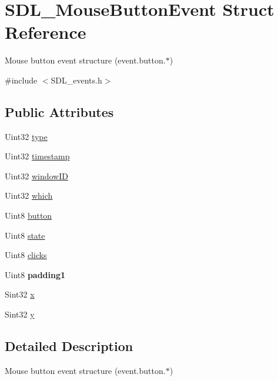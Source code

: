 \hypertarget{struct_s_d_l___mouse_button_event}{}\section{S\+D\+L\+\_\+\+Mouse\+Button\+Event Struct Reference}
\label{struct_s_d_l___mouse_button_event}


Mouse button event structure (event.\+button.$\ast$)  




{\ttfamily \#include $<$S\+D\+L\+\_\+events.\+h$>$}

\subsection*{Public Attributes}
\begin{DoxyCompactItemize}
\item 
Uint32 \mbox{\hyperlink{struct_s_d_l___mouse_button_event_af64cb09ea68b8081ecc8ee498552e3d7}{type}}
\item 
Uint32 \mbox{\hyperlink{struct_s_d_l___mouse_button_event_ab05e8a454692608ff56c502e95799c56}{timestamp}}
\item 
Uint32 \mbox{\hyperlink{struct_s_d_l___mouse_button_event_ab3b855d4b543b5d02fcf5d56e4421393}{window\+ID}}
\item 
Uint32 \mbox{\hyperlink{struct_s_d_l___mouse_button_event_a366aef59a0f393afc8a3561e741825df}{which}}
\item 
Uint8 \mbox{\hyperlink{struct_s_d_l___mouse_button_event_a1a4680e19ae06d02d2093f0bcba1b24c}{button}}
\item 
Uint8 \mbox{\hyperlink{struct_s_d_l___mouse_button_event_a8809cef85cfffad4f2059f2ba4fc6a3d}{state}}
\item 
Uint8 \mbox{\hyperlink{struct_s_d_l___mouse_button_event_aa606bebcbc3ffc7e932016039c2a36a1}{clicks}}
\item 
\mbox{\label{struct_s_d_l___mouse_button_event_a765957d218d16fa00558fa4d20e80689}} 
Uint8 {\bfseries padding1}
\item 
Sint32 \mbox{\hyperlink{struct_s_d_l___mouse_button_event_a5bb9c61b86e999f58637511e32e3a076}{x}}
\item 
Sint32 \mbox{\hyperlink{struct_s_d_l___mouse_button_event_a7ccb5c55a7ddadce723f4ea6d5269540}{y}}
\end{DoxyCompactItemize}


\subsection{Detailed Description}
Mouse button event structure (event.\+button.$\ast$) 

